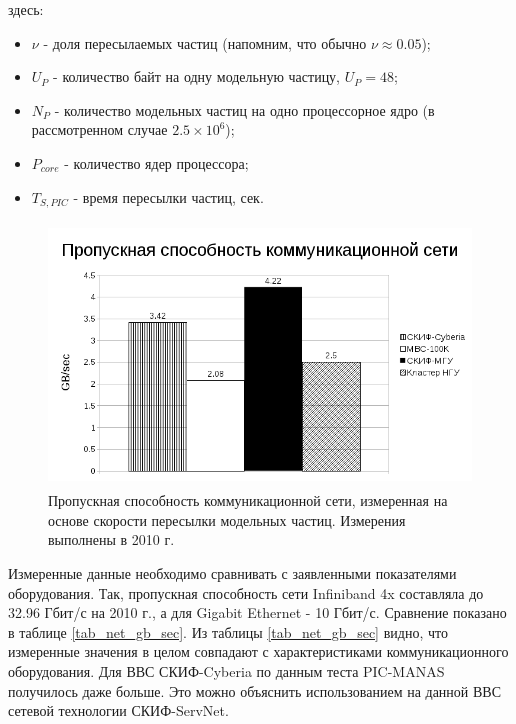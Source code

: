 здесь:
\begin{itemize}
	\item $\nu$ - доля пересылаемых частиц (напомним, что обычно $\nu \approx 0.05$);
	\item $U_P$ - количество байт на одну модельную частицу, $U_P = 48$;
	\item $N_P$ - количество модельных частиц на одно процессорное ядро (в рассмотренном случае $2.5\times 10^6$);  
	\item $P_{core}$ - количество ядер процессора;
	\item $T_{S,PIC}$  - время пересылки частиц, сек.
\end{itemize}	



\begin{figure}[htb]
	\begin{center}
		\includegraphics[height=7cm,keepaspectratio]{images/network_throughput_GB_sec.png}
	\end{center}
	\caption{Пропускная способность коммуникационной сети, измеренная на основе скорости пересылки модельных частиц. Измерения выполнены в 2010 г.}
	\label{plot_net_gb_sec}
\end{figure} 

Измеренные данные необходимо сравнивать с заявленными показателями оборудования. Так, пропускная способность сети Infiniband 4x составляла до 32.96 Гбит/с на 2010 г.,  а для Gigabit Ethernet - 10 Гбит/с. Сравнение показано в таблице  \ref{tab_net_gb_sec}. Из таблицы  \ref{tab_net_gb_sec} видно, что измеренные значения в целом совпадают с характеристиками коммуникационного оборудования. Для ВВС СКИФ-Cyberia по данным теста PIC-MANAS получилось даже больше. Это можно объяснить использованием на данной ВВС сетевой технологии СКИФ-ServNet. 

\clearpage

